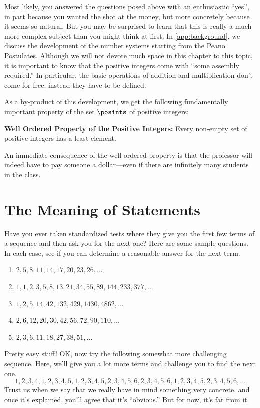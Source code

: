Most likely, you answered the questions posed above with an
enthusiastic ``yes'', in part because you wanted the shot at the
money, but more concretely because it seems so natural.  But you may
be surprised to learn that this is really a much more complex subject
than you might think at first.  In \autoref{app:background}, we discuss
the development of the number systems starting from the Peano
Postulates.  Although we will not devote much space in this chapter to
this topic, it is important to know that the positive integers come
with ``some assembly required.''  In particular, the basic operations
of addition and multiplication don't come for free; instead they have
to be defined.

As a by-product of this development, we get the following
fundamentally important property of the set $\posints$ of positive
integers:

\medskip
\noindent\textbf{Well Ordered Property of the Positive Integers:}\quad 
Every non-empty set of positive integers has a least element.

\medskip 

An immediate consequence of the well ordered property is that the
professor will indeed have to pay someone a dollar---even if there are
infinitely many students in the class.

\section{The Meaning of Statements}\label{s:induction:statements}

Have you ever taken standardized tests where they give you the first
few terms of a sequence and then ask you for the next one? Here are
some sample questions.  In each case, see if you can determine a
reasonable answer for the next term.

\begin{enumerate}
\item $2,5,8,11,14,17,20,23,26,\dots$
\item $1,1,2,3,5,8,13,21,34,55,89,144,233,377,\dots$
\item $1,2,5,14,42,132,429,1430,4862,\dots$
\item $2,6,12,20,30,42,56,72,90,110,\dots$
\item $2,3,6,11,18,27,38,51,\dots$
\end{enumerate}

Pretty easy stuff!  OK, now try the following somewhat more
challenging sequence.  Here, we'll give you a lot more terms and
challenge you to find the next one.
\[
1,2,3,4,1,2,3,4,5,1,2,3,4,5,2,3,4,5,6,2,3,4,5,6,1,2,3,4,5,2,3,4,5,6,\dots
\]
Trust us when we say that we really have in mind something very
concrete, and once it's explained, you'll agree that it's ``obvious.''
But for now, it's far from it.

